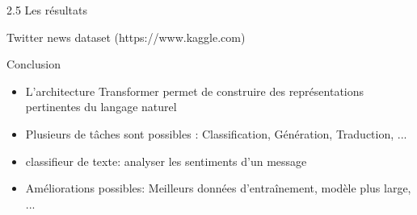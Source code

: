 \documentclass[12pt]{beamer}
\begin{document}

\begin{frame}{2.5 Les résultats}

\begin{center}
Twitter news dataset (https://www.kaggle.com)
\end{center}

\end{frame}




\begin{frame}{Conclusion}

\begin{itemize}
	\item L'architecture Transformer permet de construire des représentations pertinentes du langage naturel
	\vspace{8px}
	\item Plusieurs de tâches sont possibles : Classification, Génération, Traduction, ...
	\vspace{8px}
	\item classifieur de texte: analyser les sentiments d'un message
	\vspace{8px}
	\item Améliorations possibles: Meilleurs données d'entraînement, modèle plus large, ...
\end{itemize}


\end{frame}


\end{document}
